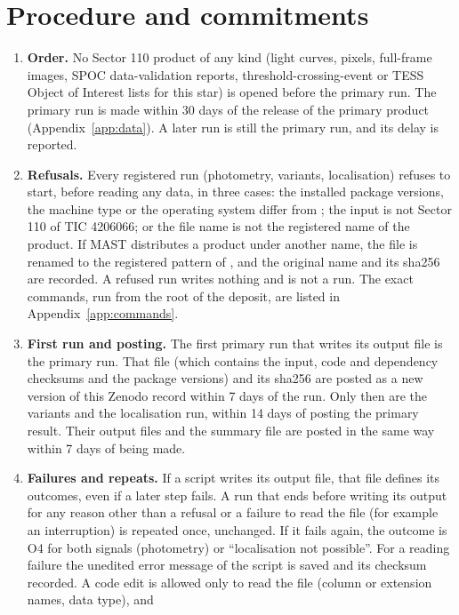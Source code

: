 \section{Procedure and commitments} \label{app:procedure}

\begin{enumerate}
\item \textbf{Order.} No Sector 110 product of any kind (light curves, pixels, full-frame images, SPOC data-validation
  reports, threshold-crossing-event or TESS Object of Interest lists for this star) is opened before the primary run.
  The primary run is made within 30 days of the release of the primary product (Appendix~\ref{app:data}). A later run is
  still the primary run, and its delay is reported.
\item \textbf{Refusals.} Every registered run (photometry, variants, localisation) refuses to start, before reading any
  data, in three cases: the installed package versions, the machine type or the operating system differ from
  ; the input is not Sector 110 of TIC 4206066; or the file name is not the registered name of
  the product. If MAST distributes a product under another name, the file is renamed to the registered pattern of
  , and the original name and its sha256 are recorded. A refused run writes nothing and is not a
  run. The exact commands, run from the root of the deposit, are listed in
  Appendix~\ref{app:commands}.
\item \textbf{First run and posting.} The first primary run that writes its output file is the primary run. That file
  (which contains the input, code and dependency checksums and the package versions) and its sha256 are posted as a new
  version of this Zenodo record within 7 days of the run. Only then are the variants and the localisation run, within
  14 days of posting the primary result. Their output files and the summary file are posted in the same way within 7
  days of being made.
\item \textbf{Failures and repeats.} If a script writes its output file, that file defines its outcomes, even if a later
  step fails. A run that ends before writing its output for any reason other than a refusal or a failure to read the
  file (for example an interruption) is repeated once, unchanged. If it fails again, the outcome is O4 for both signals
  (photometry) or ``localisation not possible''. For a reading failure the unedited error message of the script is saved
  and its checksum recorded. A code edit is allowed only to read the file (column or extension names, data type), and

\end{enumerate}
